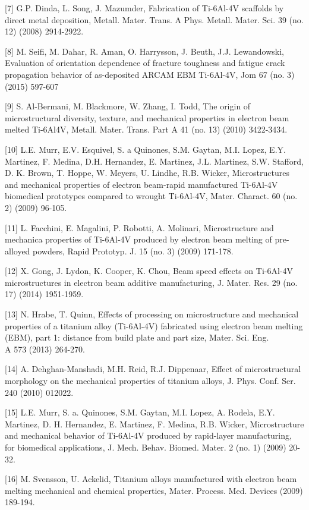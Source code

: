 \documentclass[10pt]{article}
\begin{document}
[7] G.P. Dinda, L. Song, J. Mazumder, Fabrication of Ti-6Al-4V scaffolds by direct metal deposition, Metall. Mater. Trans. A Phys. Metall. Mater. Sci. 39 (no. 12) (2008) 2914-2922.

[8] M. Seifi, M. Dahar, R. Aman, O. Harrysson, J. Beuth, J.J. Lewandowski, Evaluation of orientation dependence of fracture toughness and fatigue crack propagation behavior of as-deposited ARCAM EBM Ti-6Al-4V, Jom 67 (no. 3) (2015) 597-607

[9] S. Al-Bermani, M. Blackmore, W. Zhang, I. Todd, The origin of microstructural diversity, texture, and mechanical properties in electron beam melted Ti-6Al4V, Metall. Mater. Trans. Part A 41 (no. 13) (2010) 3422-3434.

[10] L.E. Murr, E.V. Esquivel, S. a Quinones, S.M. Gaytan, M.I. Lopez, E.Y. Martinez, F. Medina, D.H. Hernandez, E. Martinez, J.L. Martinez, S.W. Stafford, D. K. Brown, T. Hoppe, W. Meyers, U. Lindhe, R.B. Wicker, Microstructures and mechanical properties of electron beam-rapid manufactured Ti-6Al-4V biomedical prototypes compared to wrought Ti-6Al-4V, Mater. Charact. 60 (no. 2) (2009) 96-105.

[11] L. Facchini, E. Magalini, P. Robotti, A. Molinari, Microstructure and mechanica properties of Ti-6Al-4V produced by electron beam melting of pre-alloyed powders, Rapid Prototyp. J. 15 (no. 3) (2009) 171-178.

[12] X. Gong, J. Lydon, K. Cooper, K. Chou, Beam speed effects on Ti-6Al-4V microstructures in electron beam additive manufacturing, J. Mater. Res. 29 (no. 17) (2014) 1951-1959.

[13] N. Hrabe, T. Quinn, Effects of processing on microstructure and mechanical properties of a titanium alloy (Ti-6Al-4V) fabricated using electron beam melting (EBM), part 1: distance from build plate and part size, Mater. Sci. Eng.\\
A 573 (2013) 264-270.

[14] A. Dehghan-Manshadi, M.H. Reid, R.J. Dippenaar, Effect of microstructural morphology on the mechanical properties of titanium alloys, J. Phys. Conf. Ser. 240 (2010) 012022.

[15] L.E. Murr, S. a. Quinones, S.M. Gaytan, M.I. Lopez, A. Rodela, E.Y. Martinez, D. H. Hernandez, E. Martinez, F. Medina, R.B. Wicker, Microstructure and mechanical behavior of Ti-6Al-4V produced by rapid-layer manufacturing, for biomedical applications, J. Mech. Behav. Biomed. Mater. 2 (no. 1) (2009) 20-32.

[16] M. Svensson, U. Ackelid, Titanium alloys manufactured with electron beam melting mechanical and chemical properties, Mater. Process. Med. Devices (2009) 189-194.
\end{document}
